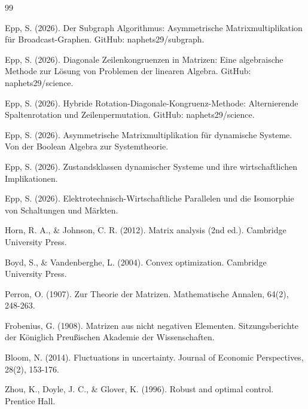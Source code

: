 \documentclass[a4paper,12pt]{article}
\theoremstyle{definition}
\begin{document}
\begin{thebibliography}{99}

Epp, S. (2026). Der Subgraph Algorithmus: Asymmetrische Matrixmultiplikation für Broadcast-Graphen. GitHub: naphets29/subgraph.

Epp, S. (2026). Diagonale Zeilenkongruenzen in Matrizen: Eine algebraische Methode zur Lösung von Problemen der linearen Algebra. GitHub: naphets29/science.

Epp, S. (2026). Hybride Rotation-Diagonale-Kongruenz-Methode: Alternierende Spaltenrotation und Zeilenpermutation. GitHub: naphets29/science.

Epp, S. (2026). Asymmetrische Matrixmultiplikation für dynamische Systeme. Von der Boolean Algebra zur Systemtheorie.

Epp, S. (2026). Zustandsklassen dynamischer Systeme und ihre wirtschaftlichen Implikationen.

Epp, S. (2026). Elektrotechnisch-Wirtschaftliche Parallelen und die Isomorphie von Schaltungen und Märkten.

Horn, R. A., \& Johnson, C. R. (2012). Matrix analysis (2nd ed.). Cambridge University Press.

Boyd, S., \& Vandenberghe, L. (2004). Convex optimization. Cambridge University Press.

Perron, O. (1907). Zur Theorie der Matrizen. Mathematische Annalen, 64(2), 248-263.

Frobenius, G. (1908). Matrizen aus nicht negativen Elementen. Sitzungsberichte der Königlich Preußischen Akademie der Wissenschaften.

Bloom, N. (2014). Fluctuations in uncertainty. Journal of Economic Perspectives, 28(2), 153-176.

Zhou, K., Doyle, J. C., \& Glover, K. (1996). Robust and optimal control. Prentice Hall.

\end{thebibliography}
\end{document}

